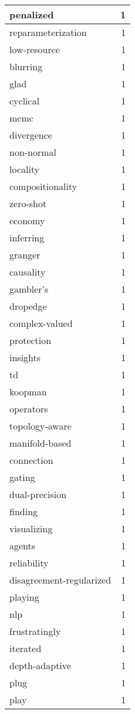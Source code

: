 \begin{table}[h]
\begin{tabular}{|l|r|}
\hline
penalized & 1 \\
\hline
reparameterization & 1 \\
\hline
low-resource & 1 \\
\hline
blurring & 1 \\
\hline
glad & 1 \\
\hline
cyclical & 1 \\
\hline
mcmc & 1 \\
\hline
divergence & 1 \\
\hline
non-normal & 1 \\
\hline
locality & 1 \\
\hline
compositionality & 1 \\
\hline
zero-shot & 1 \\
\hline
economy & 1 \\
\hline
inferring & 1 \\
\hline
granger & 1 \\
\hline
causality & 1 \\
\hline
gambler's & 1 \\
\hline
dropedge & 1 \\
\hline
complex-valued & 1 \\
\hline
protection & 1 \\
\hline
insights & 1 \\
\hline
td & 1 \\
\hline
koopman & 1 \\
\hline
operators & 1 \\
\hline
topology-aware & 1 \\
\hline
manifold-based & 1 \\
\hline
connection & 1 \\
\hline
gating & 1 \\
\hline
dual-precision & 1 \\
\hline
finding & 1 \\
\hline
visualizing & 1 \\
\hline
agents & 1 \\
\hline
reliability & 1 \\
\hline
disagreement-regularized & 1 \\
\hline
playing & 1 \\
\hline
nlp & 1 \\
\hline
frustratingly & 1 \\
\hline
iterated & 1 \\
\hline
depth-adaptive & 1 \\
\hline
plug & 1 \\
\hline
play & 1 \\

\end{tabular}
\end{table}
